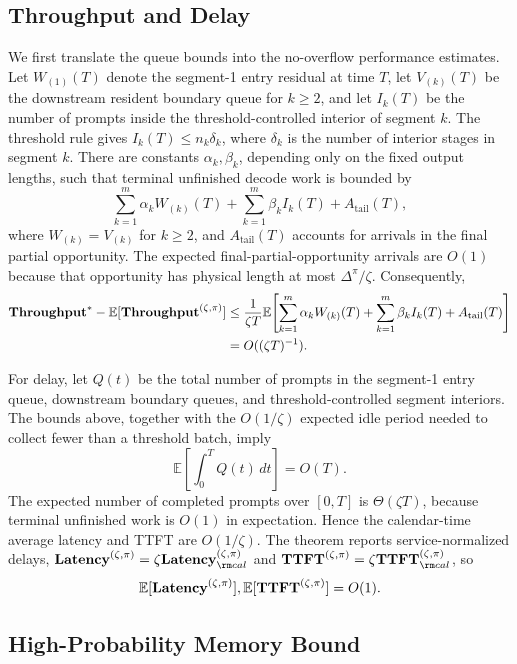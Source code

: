 \subsection{Throughput and Delay}

We first translate the queue bounds into the no-overflow performance estimates. Let \(W_{(1)}(T)\) denote the segment-1 entry residual at time \(T\), let \(V_{(k)}(T)\) be the downstream resident boundary queue for \(k\ge2\), and let \(I_k(T)\) be the number of prompts inside the threshold-controlled interior of segment \(k\). The threshold rule gives \(I_k(T)\le n_k\delta_k\), where \(\delta_k\) is the number of interior stages in segment \(k\). There are constants \(\alpha_k,\beta_k\), depending only on the fixed output lengths, such that terminal unfinished decode work is bounded by
\[
    \sum_{k=1}^m \alpha_k W_{(k)}(T)
    +
    \sum_{k=1}^m \beta_k I_k(T)
    +
    A_{\mathrm{tail}}(T),
\]
where \(W_{(k)}=V_{(k)}\) for \(k\ge2\), and \(A_{\mathrm{tail}}(T)\) accounts for arrivals in the final partial opportunity. The expected final-partial-opportunity arrivals are \(O(1)\) because that opportunity has physical length at most \(\Delta^\pi/\zeta\). Consequently,
\[
\begin{aligned}
    \textbf{Throughput}^*-\mathbb{E}[\textbf{Throughput}^{(\zeta,\pi)}]
    &\le
    \frac{1}{\zeta T}
    \mathbb{E}\!\left[
    \sum_{k=1}^m \alpha_k W_{(k)}(T)
    +
    \sum_{k=1}^m \beta_k I_k(T)
    +
    A_{\mathrm{tail}}(T)
    \right]  \\
    &= O((\zeta T)^{-1}).
\end{aligned}
\]

For delay, let \(Q(t)\) be the total number of prompts in the segment-1 entry queue, downstream boundary queues, and threshold-controlled segment interiors. The bounds above, together with the \(O(1/\zeta)\) expected idle period needed to collect fewer than a threshold batch, imply
\[
    \mathbb{E}\!\left[\int_0^T Q(t)\,dt\right]=O(T).
\]
The expected number of completed prompts over \([0,T]\) is \(\Theta(\zeta T)\), because terminal unfinished work is \(O(1)\) in expectation. Hence the calendar-time average latency and TTFT are \(O(1/\zeta)\). The theorem reports service-normalized delays, \(\Latency^{(\zeta,\pi)}=\zeta\Latency_{\rm cal}^{(\zeta,\pi)}\) and \(\TTFT^{(\zeta,\pi)}=\zeta\TTFT_{\rm cal}^{(\zeta,\pi)}\), so
\[
    \mathbb{E}[\textbf{Latency}^{(\zeta,\pi)}],
    \mathbb{E}[\textbf{TTFT}^{(\zeta,\pi)}]
    =
    O(1).
\]

\subsection{High-Probability Memory Bound}

